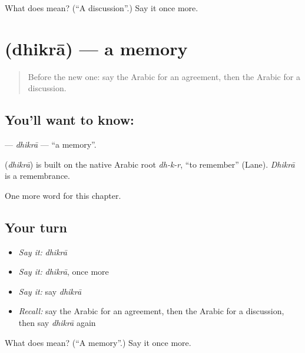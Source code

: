\begin{tcolorbox}[breakable,colback=teal!4,colframe=teal!35!black,title={Before you move on}]
What does  mean? (\textquotedblleft{}A discussion\textquotedblright{}.) Say it once more.
\end{tcolorbox}
\section[\texorpdfstring{\ar{ذكرى} (dhikrā)}{ذكرى (dhikrā)}]{ (dhikrā) — a memory}

\label{lesson:AR-C239-dhikra}



\begin{quote}
Before the new one: say the Arabic for an agreement, then the Arabic for a discussion.
\end{quote}

\subsection*{You'll want to know: }
\textbf{} — \emph{dhikrā} — \textquotedblleft{}a memory\textquotedblright{}.

\begin{cousinweb}
\textbf{} (\emph{dhikrā}) is built on the native Arabic root \emph{dh-k-r}, \textquotedblleft{}to remember\textquotedblright{} (Lane). \emph{Dhikrā} is a remembrance.
\end{cousinweb}

\begin{grammarlens}[title={What you've built}]
One more word for this chapter.
\end{grammarlens}

\subsection*{Your turn}
\begin{itemize}
\raggedright
  \item \emph{Say it:} \emph{dhikrā}
  \item \emph{Say it:} \emph{dhikrā}, once more
  \item \emph{Say it:} say \emph{dhikrā}
  \item \emph{Recall:} say the Arabic for an agreement, then the Arabic for a discussion, then say \emph{dhikrā} again
\end{itemize}

\begin{tcolorbox}[breakable,colback=teal!4,colframe=teal!35!black,title={Before you move on}]
What does  mean? (\textquotedblleft{}A memory\textquotedblright{}.) Say it once more.
\end{tcolorbox}
